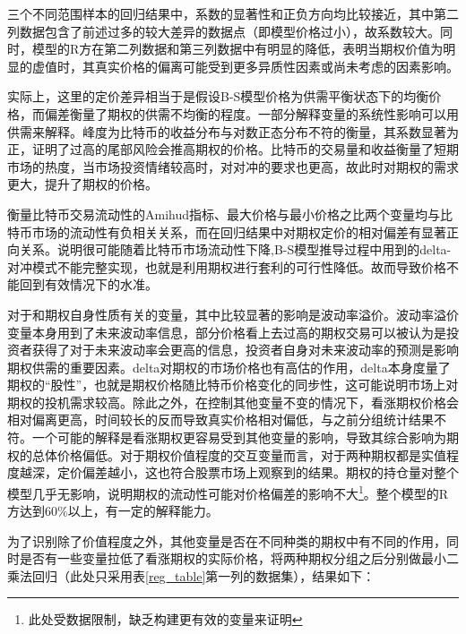 \newpage
\restoregeometry
\par{三个不同范围样本的回归结果中，系数的显著性和正负方向均比较接近，其中第二列数据包含了前述过多的较大差异的数据点（即模型价格过小），故系数较大。同时，模型的R方在第二列数据和第三列数据中有明显的降低，表明当期权价值为明显的虚值时，其真实价格的偏离可能受到更多异质性因素或尚未考虑的因素影响。}
\par{
实际上，这里的定价差异相当于是假设B-S模型价格为供需平衡状态下的均衡价格，而偏差衡量了期权的供需不均衡的程度。一部分解释变量的系统性影响可以用供需来解释。峰度为比特币的收益分布与对数正态分布不符的衡量，其系数显著为正，证明了过高的尾部风险会推高期权的价格。比特币的交易量和收益衡量了短期市场的热度，当市场投资情绪较高时，对对冲的要求也更高，故此时对期权的需求更大，提升了期权的价格。}
\par{衡量比特币交易流动性的Amihud指标、最大价格与最小价格之比两个变量均与比特币市场的流动性有负相关关系，而在回归结果中对期权定价的相对偏差有显著正向关系。说明很可能随着比特币市场流动性下降,B-S模型推导过程中用到的delta-对冲模式不能完整实现，也就是利用期权进行套利的可行性降低。故而导致价格不能回到有效情况下的水准。
}
\par{对于和期权自身性质有关的变量，其中比较显著的影响是波动率溢价。波动率溢价变量本身用到了未来波动率信息，部分价格看上去过高的期权交易可以被认为是投资者获得了对于未来波动率会更高的信息，投资者自身对未来波动率的预测是影响期权供需的重要因素。delta对期权的市场价格也有高估的作用，delta本身度量了期权的“股性”，也就是期权价格随比特币价格变化的同步性，这可能说明市场上对期权的投机需求较高。除此之外，在控制其他变量不变的情况下，看涨期权价格会相对偏离更高，时间较长的反而导致真实价格相对偏低，与之前分组统计结果不符。一个可能的解释是看涨期权更容易受到其他变量的影响，导致其综合影响为期权的总体价格偏低。对于期权价值程度的交互变量而言，对于两种期权都是实值程度越深，定价偏差越小，这也符合股票市场上观察到的结果。期权的持仓量对整个模型几乎无影响，说明期权的流动性可能对价格偏差的影响不大\footnote{此处受数据限制，缺乏构建更有效的变量来证明}。整个模型的R方达到60$\%$以上，有一定的解释能力。}
\par{为了识别除了价值程度之外，其他变量是否在不同种类的期权中有不同的作用，同时是否有一些变量拉低了看涨期权的实际价格，将两种期权分组之后分别做最小二乘法回归（此处只采用表\ref{reg_table}第一列的数据集），结果如下：}
\newpage
{}
